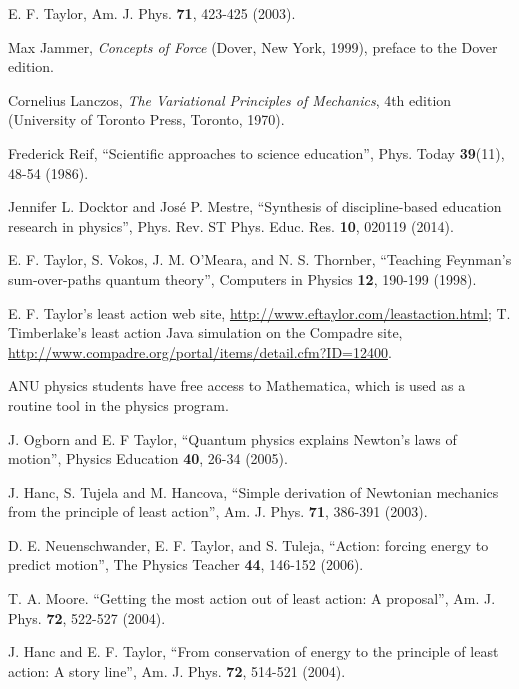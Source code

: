 \documentclass[prb,oncolumn,12pt]{revtex4-2}
\begin{document}
\begin{thebibliography}{99}

 E. F. Taylor, Am. J. Phys. \textbf{71}, 423-425 (2003).

 Max Jammer, \textit{Concepts of Force} (Dover, New York, 1999), preface to the Dover edition.

 Cornelius Lanczos, \textit{The Variational Principles of Mechanics}, 4th edition (University of Toronto Press, Toronto, 1970).

 Frederick Reif, ``Scientific approaches to science education'', Phys. Today \textbf{39}(11), 48-54 (1986).

 Jennifer L. Docktor and Jos\'e P. Mestre, ``Synthesis of discipline-based education research in physics'', Phys. Rev. ST Phys. Educ. Res. \textbf{10}, 020119 (2014).

 E. F. Taylor, S. Vokos, J. M. O'Meara, and N. S. Thornber, ``Teaching Feynman's sum-over-paths quantum theory'', Computers in Physics \textbf{12},  190-199 (1998).

  E. F. Taylor's least action web site, \url{http://www.eftaylor.com/leastaction.html}; T. Timberlake's least action Java simulation on the Compadre site, \url{http://www.compadre.org/portal/items/detail.cfm?ID=12400}.

 ANU physics students have free access to Mathematica, which is used as a routine tool in the physics program.

 J. Ogborn and E. F Taylor, ``Quantum physics explains Newton's laws of motion'', Physics Education \textbf{40}, 26-34 (2005).

 J. Hanc, S. Tujela and M. Hancova, ``Simple derivation of Newtonian mechanics from the principle of least action'', Am. J. Phys. \textbf{71}, 386-391 (2003).

 D. E. Neuenschwander, E. F. Taylor, and S. Tuleja, ``Action: forcing energy to predict motion'', The Physics Teacher \textbf{44}, 146-152 (2006).

 T. A. Moore. ``Getting the most action out of least action: A proposal'', Am. J. Phys. \textbf{72}, 522-527 (2004).

 J. Hanc and E. F. Taylor, ``From conservation of energy to the principle of least action: A story line'', Am. J. Phys. \textbf{72}, 514-521 (2004).


\end{thebibliography}
\end{document}

